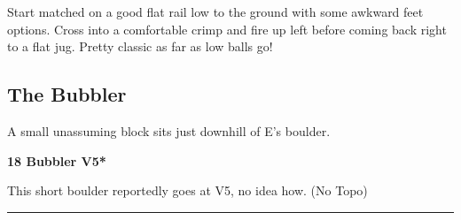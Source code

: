 \begin{multicols}{2}
\begin{minipage}{\linewidth}
					\begin{adjustwidth}{0.5cm}{}				
					Start matched on a good flat rail low to the ground with some awkward feet options. Cross into a comfortable crimp and fire up left before coming back right to a flat jug. Pretty classic as far as low balls go!
					\end{adjustwidth}
					\end{minipage}
			\subsection*{The Bubbler}\label{bf:The Bubbler}
			\begin{minipage}{\columnwidth}
			A small unassuming block sits just downhill of E's boulder.
			\end{minipage}
			
					\begin{minipage}{\linewidth}	
					\label{rt:Bubbler}
\colorbox{RoyalBlue!20}{
\textbf{
18 Bubbler V5*  
}
}

					\begin{adjustwidth}{0.5cm}{}				
					This short boulder reportedly goes at V5, no idea how.
						\newline (No Topo) 
					\end{adjustwidth}
					\end{minipage}
\end{multicols}
\rule{\textwidth}{1pt}
